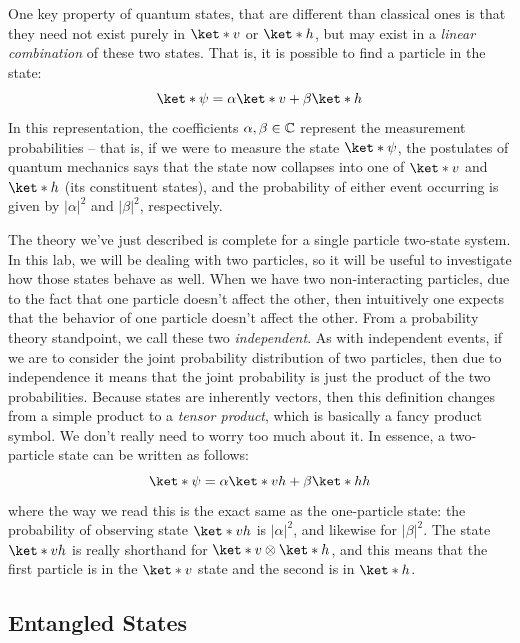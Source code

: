 \documentclass[10pt]{article}
\begin{document}
	One key property of quantum states, that are different than classical ones is that they need not exist
	purely in \( \ket*{v} \) or \( \ket*{h} \), but may exist in a \textit{linear combination} of these two
	states. That is, it is possible to find a particle in the state:
	\[
		\ket*{\psi} = \alpha \ket*{v} + \beta \ket*{h}
	\]
	In this representation, the coefficients \( \alpha, \beta \in \mathbb C \) represent the measurement
	probabilities -- that is, if we were to measure the state \( \ket*{\psi} \), the postulates of quantum
	mechanics says that the state now collapses into one of \( \ket*{v} \) and \( \ket*{h} \) (its
	constituent states), and the probability of either event occurring is given by \( |\alpha|^2 \) and \(
	|\beta|^2 \), respectively.

	The theory we've just described is complete for a single particle two-state system. In this lab, we will
	be dealing with two particles, so it will be useful to investigate how those states behave as well.
	When we have two non-interacting particles, due to the fact that one particle doesn't affect the
	other, then intuitively one expects that the behavior of one particle doesn't affect the other. From a
	probability theory standpoint, we call these two \textit{independent}. As with independent events, if we
	are to consider the joint probability distribution of two particles, then due to independence it means
	that the joint probability is just the product of the two probabilities. Because states are inherently
	vectors, then this definition changes from a simple product to a \textit{tensor product}, which is
	basically a fancy product symbol. We don't really need to worry too much about it. In essence, a
	two-particle state can be written as follows:
	\begin{equation}
		\label{state}
		\ket*{\psi} = \alpha \ket*{vh} + \beta \ket*{hh}
	\end{equation}
	where the way we read this is the exact same as the one-particle state: the probability of observing
	state \( \ket*{vh} \) is \( |\alpha|^2 \), and likewise for \( |\beta|^2 \). The state \( \ket*{vh} \) is
	really shorthand for \( \ket*{v} \otimes \ket*{h} \), and this means that the first particle is in the \(
	\ket*{v}\) state and the second is in \( \ket*{h} \). 

	\subsection{Entangled States}
	
\end{document}
